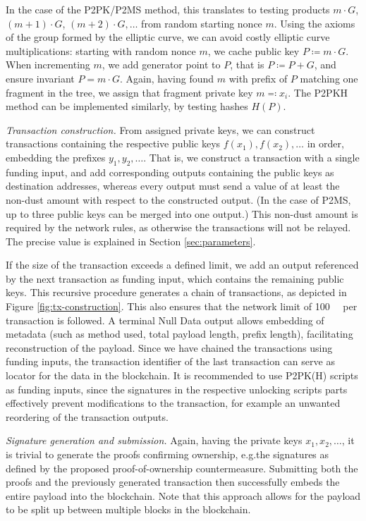 \documentclass[a4paper,11pt,titlepage]{scrbook}
\begin{document}
In the case of the P2PK/P2MS method, this translates to testing products $m\cdot G$, $(m{+}1)\cdot G$, $(m{+}2)\cdot G,\dots$ from random starting nonce $m$.
Using the axioms of the group formed by the elliptic curve, we can avoid costly elliptic curve multiplications: starting with random nonce $m$, we cache public key $P\coloneqq m\cdot G$.
When incrementing $m$, we add generator point to $P$, that is $P\coloneqq P+G$, and ensure invariant $P= m\cdot G$.
Again, having found $m$ with prefix of $P$ matching one fragment in the tree, we assign that fragment private key $m\eqqcolon x_i$.
The P2PKH method can be implemented similarly, by testing hashes $H(P)$.

\emph{Transaction construction.}
From assigned private keys, we can construct transactions containing the respective public keys $f(x_1), f(x_2), \dots$ in order, embedding the prefixes $y_1, y_2, \dots$.
That is, we construct a transaction with a single funding input, and add corresponding outputs containing the public keys as destination addresses, whereas every output must send a value of at least the non-dust amount with respect to the constructed output. (In the case of P2MS, up to three public keys can be merged into one output.)
This non-dust amount is required by the network rules, as otherwise the transactions will not be relayed.
The precise value is explained in Section \ref{sec:parameters}.


If the size of the transaction exceeds a defined limit, we add an output referenced by the next transaction as funding input, which contains the remaining public keys. This recursive procedure generates a chain of transactions, as depicted in Figure \ref{fig:tx-construction}.
This also ensures that the network limit of \SI{100}{\kilo\byte} per transaction is followed.
A terminal Null Data output allows embedding of metadata (such as method used, total payload length, prefix length), facilitating reconstruction of the payload.
Since we have chained the transactions using funding inputs, the transaction identifier of the last transaction can serve as locator for the data in the blockchain.
It is recommended to use P2PK(H) scripts as funding inputs, since the signatures in the respective unlocking scripts parts effectively prevent modifications to the transaction, for example an unwanted reordering of the transaction outputs.

\emph{Signature generation and submission.}
Again, having the private keys $x_1, x_2, \dots$, it is trivial to generate the proofs confirming ownership, e.g.\@ the signatures as defined by the proposed proof-of-ownership countermeasure.
Submitting both the proofs and the previously generated transaction then successfully embeds the entire payload into the blockchain.
Note that this approach allows for the payload to be split up between multiple blocks in the blockchain.
\end{document}
